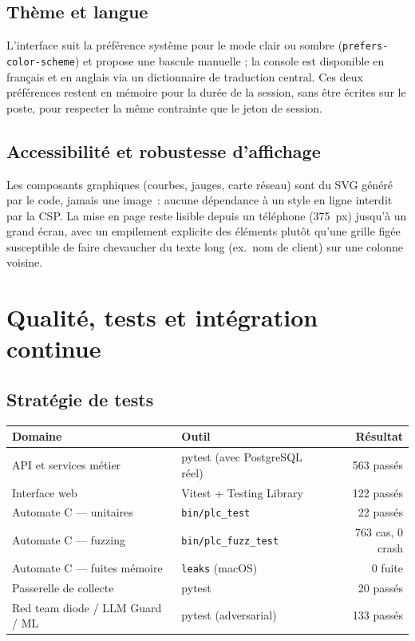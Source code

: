 \documentclass[11pt,a4paper]{report}
\begin{document}
\section{Thème et langue}
L'interface suit la préférence système pour le mode clair ou sombre
(\texttt{prefers-color-scheme}) et propose une bascule manuelle ; la console
est disponible en français et en anglais via un dictionnaire de traduction
central. Ces deux préférences restent en mémoire pour la durée de la session,
sans être écrites sur le poste, pour respecter la même contrainte que le
jeton de session.

\section{Accessibilité et robustesse d'affichage}
Les composants graphiques (courbes, jauges, carte réseau) sont du SVG
généré par le code, jamais une image~: aucune dépendance à un style en ligne
interdit par la CSP. La mise en page reste lisible depuis un téléphone
(375~px) jusqu'à un grand écran, avec un empilement explicite des éléments
plutôt qu'une grille figée susceptible de faire chevaucher du texte long
(ex.~nom de client) sur une colonne voisine.

\chapter{Qualité, tests et intégration continue}
\label{chap:qualite}

\section{Stratégie de tests}
\begin{center}
\begin{tabular}{@{}llr@{}}
\toprule
\textbf{Domaine} & \textbf{Outil} & \textbf{Résultat} \\
\midrule
API et services métier & pytest (avec PostgreSQL réel) & 563 passés \\
Interface web & Vitest + Testing Library & 122 passés \\
Automate C --- unitaires & \texttt{bin/plc\_test} & 22 passés \\
Automate C --- fuzzing & \texttt{bin/plc\_fuzz\_test} & 763 cas, 0 crash \\
Automate C --- fuites mémoire & \texttt{leaks} (macOS) & 0 fuite \\
Passerelle de collecte & pytest & 20 passés \\
Red team diode / LLM Guard / ML & pytest (adversarial) & 133 passés \\
\bottomrule
\end{tabular}
\end{center}
\end{document}
